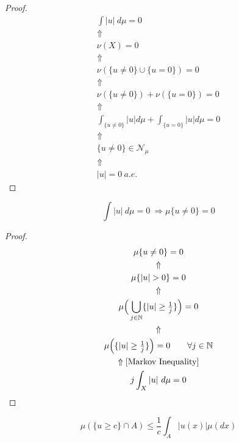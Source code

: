 \begin{proof}
\begin{gather*}
\int |u|\  d\mu =0 \\
\Uparrow  \\
\nu (X)=0 \\
\Uparrow  \\
\nu (\{u\neq 0\}\cup \{u=0\})=0\\
\Uparrow  \\
\nu (\{u\neq 0\})+\nu (\{u=0\})=0 \\
\Uparrow  \\
\int _{\{u\neq 0\}}|u| d\mu  +\int _{\{u=0\}}|u| d\mu  =0 \\
\Uparrow  \\
\{u\neq 0\}\in \mathcal{N}_\mu  \\
\Uparrow  \\
|u|=0 \  a.e.
\end{gather*}
\end{proof}

\begin{prop}
\[
\int |u|\  d\mu =0\  \Longrightarrow  \mu \{u\neq 0\}=0
\]
\end{prop}

\begin{proof}
\begin{gather*}
\mu \{u\neq 0\}=0 \\
\Uparrow  \\
\mu \{|u|>0\}=0 \\
\Uparrow  \\
\mu \Big(\bigcup _{j\in \Bbb{N}}\{|u|\geq \tfrac{1}{j}\}\Big)=0 \\
\Uparrow \\
\mu \Big(\{|u|\geq \tfrac{1}{j}\}\Big)=0 \qquad \forall  j\in \Bbb{N} \\
\Uparrow [\text{Markov Inequality}] \\
j \int _X |u|\  d\mu  =0
\end{gather*}
\end{proof}

\begin{prop}
\[
\mu (\{u\geq c\}\cap A)\leq \frac{1}{c} \int _A |u(x)|\mu (dx)
\]
\end{prop}


